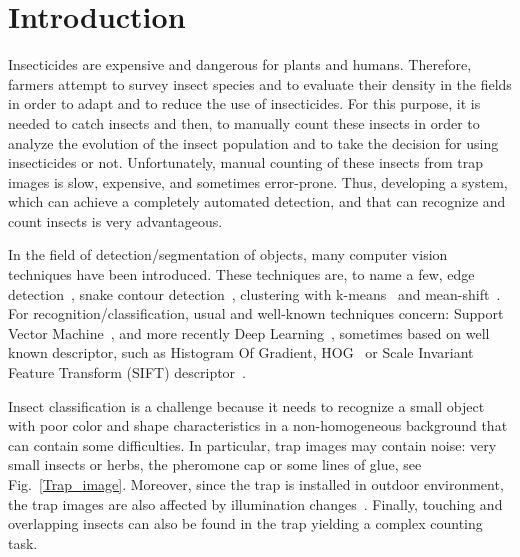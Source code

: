 \documentclass[a4paper,conference]{IEEEtran}
\begin{document}




%
\IEEEpeerreviewmaketitle

\section{Introduction}
\label{sec:introduction}

Insecticides are expensive and dangerous for plants and humans. Therefore, farmers attempt to survey insect species and to evaluate their density in the fields in order to adapt and to reduce the use of insecticides. For this purpose, it is needed to catch insects and then, to manually count these insects in order to analyze the evolution of the insect population and to take the decision for using insecticides or not. Unfortunately, manual counting of these insects from trap images is slow, expensive, and sometimes error-prone. Thus, developing a system, which can achieve a completely automated detection, and that can recognize and count insects is very advantageous. 

In the field of detection/segmentation of objects, many computer vision techniques have been introduced.
These techniques are, to name a few, edge detection~\cite{deriche1987}, snake contour detection~\cite{kass1988},  clustering with k-means~\cite{wagstaff2001constrained} and mean-shift~\cite{comaniciu2002}.  
For recognition/classification, usual and well-known techniques concern: Support Vector Machine~\cite{cortes1995support}, and more recently Deep Learning~\cite{lecun1995convolutional}, sometimes based on well known descriptor, such as Histogram Of Gradient, HOG~\cite{dalal2005histograms} or 
Scale Invariant Feature Transform (SIFT) descriptor~\cite{lowe2004}. 

Insect classification is a challenge because it needs to recognize a small object with poor color and shape characteristics in a non-homogeneous background that can contain some difficulties. In particular, trap images may contain noise: very small insects or herbs, the pheromone cap or some lines of glue, see Fig.~\ref{Trap_image}. Moreover, since the trap is installed in outdoor environment, the trap images are also affected by illumination changes~\cite{vaib1}. Finally, touching and overlapping insects can also be found in the trap yielding a complex counting task. 
\end{document}
